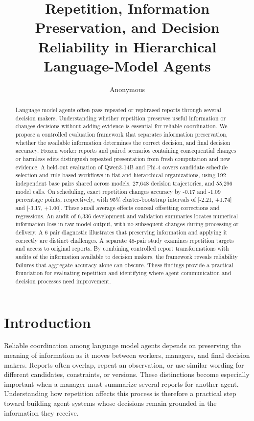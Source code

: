 \documentclass{svproc}
\begin{document}
\mainmatter
\title{Repetition, Information Preservation, and Decision Reliability in Hierarchical Language-Model Agents}
\author{Anonymous}
\maketitle

\begin{abstract}
Language model agents often pass repeated or rephrased reports through several decision makers. Understanding whether repetition preserves useful information or changes decisions without adding evidence is essential for reliable coordination. We propose a controlled evaluation framework that separates information preservation, whether the available information determines the correct decision, and final decision accuracy. Frozen worker reports and paired scenarios containing consequential changes or harmless edits distinguish repeated presentation from fresh computation and new evidence. A held-out evaluation of Qwen3-14B and Phi-4 covers candidate schedule selection and rule-based workflows in flat and hierarchical organizations, using 192 independent base pairs shared across models, 27,648 decision trajectories, and 55,296 model calls. On scheduling, exact repetition changes accuracy by -0.17 and -1.09 percentage points, respectively, with 95\% cluster-bootstrap intervals of [-2.21, +1.74] and [-3.17, +1.00]. These small average effects conceal offsetting corrections and regressions. An audit of 6,336 development and validation summaries locates numerical information loss in raw model output, with no subsequent changes during processing or delivery. A 6 pair diagnostic illustrates that preserving information and applying it correctly are distinct challenges. A separate 48-pair study examines repetition targets and access to original reports. By combining controlled report transformations with audits of the information available to decision makers, the framework reveals reliability failures that aggregate accuracy alone can obscure. These findings provide a practical foundation for evaluating repetition and identifying where agent communication and decision processes need improvement.
\end{abstract}

\section{Introduction}
Reliable coordination among language model agents depends on preserving the meaning of information as it moves between workers, managers, and final decision makers. Reports often overlap, repeat an observation, or use similar wording for different candidates, constraints, or versions. These distinctions become especially important when a manager must summarize several reports for another agent. Understanding how repetition affects this process is therefore a practical step toward building agent systems whose decisions remain grounded in the information they receive.
\end{document}
